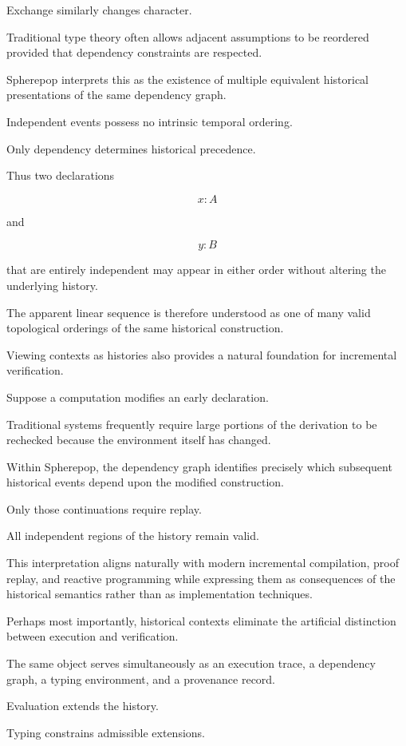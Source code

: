 \documentclass[12pt,oneside]{article}
\theoremstyle{definition}
\theoremstyle{remark}
\begin{document}
Exchange similarly changes character.

Traditional type theory often allows adjacent assumptions to be reordered
provided that dependency constraints are respected.

Spherepop interprets this as the existence of multiple equivalent historical
presentations of the same dependency graph.

Independent events possess no intrinsic temporal ordering.

Only dependency determines historical precedence.

Thus two declarations

\[
x:A
\]

and

\[
y:B
\]

that are entirely independent may appear in either order without altering the
underlying history.

The apparent linear sequence is therefore understood as one of many valid
topological orderings of the same historical construction.

Viewing contexts as histories also provides a natural foundation for
incremental verification.

Suppose a computation modifies an early declaration.

Traditional systems frequently require large portions of the derivation to be
rechecked because the environment itself has changed.

Within Spherepop, the dependency graph identifies precisely which subsequent
historical events depend upon the modified construction.

Only those continuations require replay.

All independent regions of the history remain valid.

This interpretation aligns naturally with modern incremental compilation,
proof replay, and reactive programming while expressing them as consequences
of the historical semantics rather than as implementation techniques.

Perhaps most importantly, historical contexts eliminate the artificial
distinction between execution and verification.

The same object serves simultaneously as an execution trace, a dependency
graph, a typing environment, and a provenance record.

Evaluation extends the history.

Typing constrains admissible extensions.
\end{document}
